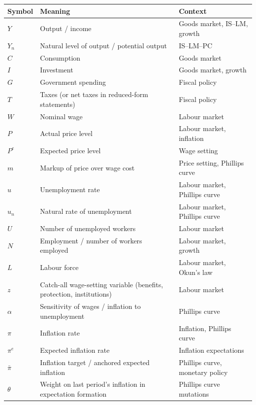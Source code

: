 \documentclass[12pt]{article}
\begin{document}
\begin{center}
\renewcommand{\arraystretch}{1.25}
\begin{tabular}{|p{2.2cm}|p{7.8cm}|p{5.0cm}|}
\hline
\textbf{Symbol} & \textbf{Meaning} & \textbf{Context} \\
\hline
$Y$ & Output / income & Goods market, IS--LM, growth \\
\hline
$Y_n$ & Natural level of output / potential output & IS--LM--PC \\
\hline
$C$ & Consumption & Goods market \\
\hline
$I$ & Investment & Goods market, growth \\
\hline
$G$ & Government spending & Fiscal policy \\
\hline
$T$ & Taxes (or net taxes in reduced-form statements) & Fiscal policy \\
\hline
$W$ & Nominal wage & Labour market \\
\hline
$P$ & Actual price level & Labour market, inflation \\
\hline
$P^e$ & Expected price level & Wage setting \\
\hline
$m$ & Markup of price over wage cost & Price setting, Phillips curve \\
\hline
$u$ & Unemployment rate & Labour market, Phillips curve \\
\hline
$u_n$ & Natural rate of unemployment & Labour market, Phillips curve \\
\hline
$U$ & Number of unemployed workers & Labour market \\
\hline
$N$ & Employment / number of workers employed & Labour market, growth \\
\hline
$L$ & Labour force & Labour market, Okun's law \\
\hline
$z$ & Catch-all wage-setting variable (benefits, protection, institutions) & Labour market \\
\hline
$\alpha$ & Sensitivity of wages / inflation to unemployment & Phillips curve \\
\hline
$\pi$ & Inflation rate & Inflation, Phillips curve \\
\hline
$\pi^e$ & Expected inflation rate & Inflation expectations \\
\hline
$\bar{\pi}$ & Inflation target / anchored expected inflation & Phillips curve, monetary policy \\
\hline
$\theta$ & Weight on last period's inflation in expectation formation & Phillips curve mutations \\
\hline

\end{tabular}
\end{center}
\end{document}
